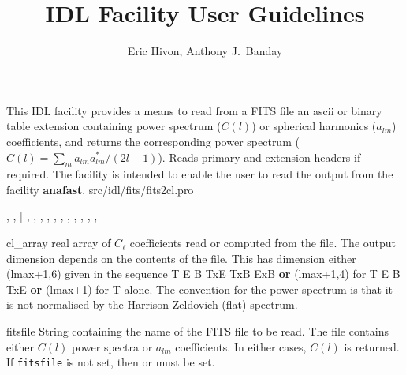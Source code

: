 

\sloppy

\title{\healpix IDL Facility User Guidelines}
 \section[fits2cl]{ }
\label{idl:fits2cl}
\author{Eric Hivon, Anthony J.~Banday}

\begin{facility}
{This IDL facility provides a means to
read from a FITS file an ascii or binary table extension containing power 
spectrum ($C(l)$) or spherical harmonics ($a_{l m}$) coefficients, and returns
the corresponding power spectrum ($C(l) = \sum_m a_{lm}a^*_{lm} / (2l+1)$). Reads primary and extension headers if
required. The facility is intended to enable the user to read the
output from the \healpix facility \textbf{anafast}.
}
{src/idl/fits/fits2cl.pro}
\end{facility}

\begin{IDLformat}
{\thedocid, 
, 
[%
, %
 ,
, 
, 
, 
,  
, 
, 
, 
, 
, 
%
]}
\end{IDLformat}

\begin{qualifiers}
  \begin{qulist}{} %
    \item[cl\_array] %
      real array of $C_\ell$ coefficients read or computed from the
      file. The output dimension depends on the contents of the file. 
	This has dimension either (lmax+1,6) given in the sequence T E B
      TxE TxB ExB {\bf or} (lmax+1,4) for T E B TxE {\bf or} (lmax+1) for T
    alone. 
     The convention for the power spectrum is that it is not
      normalised by the Harrison-Zeldovich (flat) spectrum.
%
    \item[fitsfile] %
    String containing the name of the FITS file to be read. The
    file contains either $C(l)$ power spectra or $a_{l m}$ coefficients. In either
    cases, $C(l)$ is returned. If {\tt fitsfile} is not set, then
 or
 must be set.
  \end{qulist}
\end{qualifiers}

